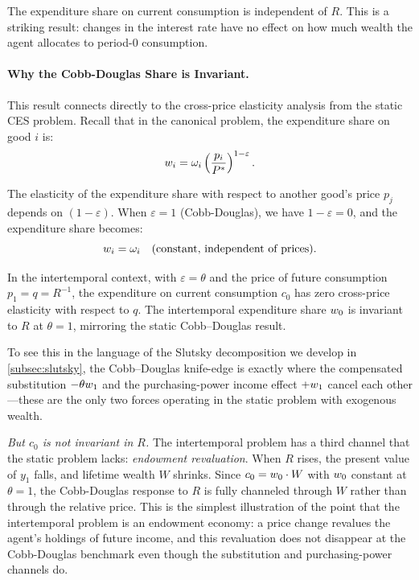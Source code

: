 The expenditure share on current consumption is independent of $R$. This is a striking result: changes in the interest rate have no effect on how much wealth the agent allocates to period-$0$ consumption.

\paragraph{Why the Cobb-Douglas Share is Invariant.}
This result connects directly to the cross-price elasticity analysis from the static CES problem. Recall that in the canonical problem, the expenditure share on good $i$ is:
\begin{equation}
w_i = \omega_i \left( \frac{p_i}{P^{*}} \right)^{1-\varepsilon}.
\label{eq:share-recall}
\end{equation}

The elasticity of the expenditure share with respect to another good's price $p_j$ depends on $(1 - \varepsilon)$. When $\varepsilon = 1$ (Cobb-Douglas), we have $1 - \varepsilon = 0$, and the expenditure share becomes:
\begin{equation}
w_i = \omega_i \quad \text{(constant, independent of prices)}.
\label{eq:share-cobb-douglas}
\end{equation}

In the intertemporal context, with $\varepsilon = \theta$ and the price of future consumption $p_1 = q = R^{-1}$, the expenditure on current consumption $c_0$ has zero cross-price elasticity with respect to $q$. The intertemporal expenditure share $w_0$ is invariant to $R$ at $\theta = 1$, mirroring the static Cobb--Douglas result.

To see this in the language of the Slutsky decomposition we develop in \cref{subsec:slutsky}, the Cobb--Douglas knife-edge is exactly where the compensated substitution $-\theta w_1$ and the purchasing-power income effect $+w_1$ cancel each other---these are the only two forces operating in the static problem with exogenous wealth.

\medskip
\noindent
\emph{But $c_0$ is not invariant in $R$.} The intertemporal problem has a third channel that the static problem lacks: \emph{endowment revaluation}. When $R$ rises, the present value of $y_1$ falls, and lifetime wealth $W$ shrinks. Since $c_0 = w_0 \cdot W$ with $w_0$ constant at $\theta = 1$, the Cobb-Douglas response to $R$ is fully channeled through $W$ rather than through the relative price. This is the simplest illustration of the point that the intertemporal problem is an endowment economy: a price change revalues the agent's holdings of future income, and this revaluation does not disappear at the Cobb-Douglas benchmark even though the substitution and purchasing-power channels do.

